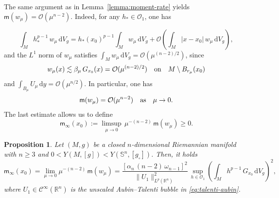 \documentclass[reqno,11pt]{amsart}
\numberwithin{equation}{section}
\newtheorem{proposition}[theorem]{Proposition}
\theoremstyle{definition}
\theoremstyle{remark}
\newcommand{\ud}{\,\mathrm{d}}
\newcommand{\R}{\mathbb{R}}
\newcommand{\Ss}{\mathbb{S}}
\begin{document}
The same argument as in Lemma~\ref{lemma:moment-rate} yields $\mathsf{m}(w_\mu) = \mathcal{O}(\mu^{n-2})$. Indeed, for any $h_* \in \mathscr{O}_1$, one has

\[
\int_M h_*^{p-1}\, w_\mu \ud V_g = h_*(x_0)^{p-1} \int_M w_\mu \ud V_g + \mathcal{O}\!\left(\int_M |x - x_0|\, w_\mu \ud V_g\right),
\]
and the $L^1$ norm of $w_\mu$ satisfies $\int_M w_\mu \ud V_g = \mathcal{O}(\mu^{(n-2)/2})$, since
\[
w_\mu(x) \lesssim \beta_\mu\, G_{x_0}(x) = \mathcal{O}(\mu^{(n-2)/2}) \quad {\rm on} \quad M \setminus B_{r_\mu}(x_0)
\]
and $\int_{B_\mu} U_\mu \ud y = \mathcal{O}(\mu^{n/2})$. In particular, one has
\[
\mathsf{m}(w_\mu) = \mathcal{O}(\mu^{n-2}) \quad {\rm as} \quad \mu \to 0.
\]
The last estimate allows us to define
\begin{equation}
\label{eq:minfty-def}
\mathsf{m}_\infty(x_0) := \limsup_{\mu \to 0}\, \mu^{-(n-2)}\, \mathsf{m}(w_\mu) \geqslant 0.
\end{equation}

\begin{proposition}
\label{prop:moment-sharp}
Let $(M, g)$ be a closed $n$-dimensional Riemannian manifold with $n \geqslant 3$ and $0 < Y(M,[g]) < Y(\Ss^n,[g_\circ])$. Then, it holds
\begin{equation}
\label{eq:minfty-formula}
\mathsf{m}_\infty(x_0) =\lim_{\mu \to 0} \mu^{-(n-2)}\, \mathsf{m}(w_\mu) = \frac{[\alpha_n\, (n-2)\, \omega_{n-1}]^2}{\|U_1\|_{L^p(\R^n)}^2}\, \sup_{h \in \mathscr{O}_1} \left(\int_M h^{p-1}\, G_{x_0} \ud V_g\right)^2,
\end{equation}
where $U_1 \in \mathcal{C}^\infty(\R^n)$ is the unscaled Aubin--Talenti bubble in \eqref{eq:talenti-aubin}.
\end{proposition}
\end{document}
